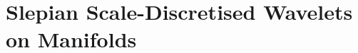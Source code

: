 \chapter{Slepian Scale-Discretised Wavelets on Manifolds}\label{sec:chapter4}






















